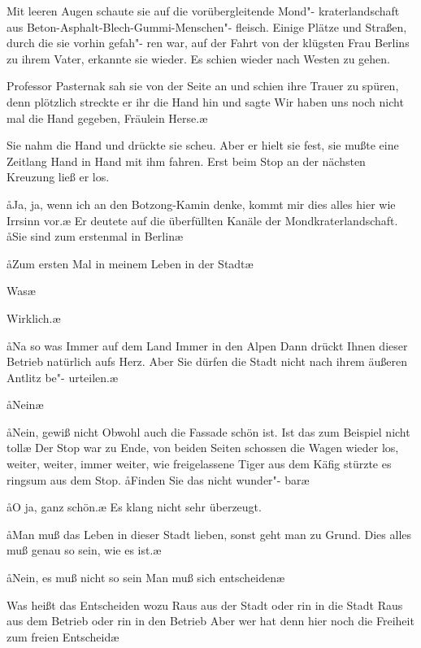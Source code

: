 Mit leeren Augen schaute sie auf die vorübergleitende Mond"-%
kraterlandschaft aus Beton-Asphalt-Blech-Gummi-Menschen"-%
fleisch. Einige Plätze und Straßen, durch die sie vorhin gefah"-%
ren war, auf der Fahrt von der klügsten Frau Berlins zu
ihrem Vater, erkannte sie wieder. Es schien wieder nach
Westen zu gehen.

Professor Pasternak sah sie von der Seite an und schien ihre
Trauer zu spüren, denn plötzlich streckte er ihr die Hand hin
und sagte\dopp{} \aanah{}Wir haben uns noch nicht mal die Hand gegeben,
Fräulein Herse.\ae{}

Sie nahm die Hand und drückte sie scheu. Aber er hielt sie fest,
sie mußte eine Zeitlang Hand in Hand mit ihm fahren.
Erst beim Stop an der nächsten Kreuzung ließ er los.

\aa{}Ja, ja, wenn ich an den Botzong-Kamin denke, kommt mir
dies alles hier wie Irrsinn vor.\ae{} Er deutete auf die überfüllten
Kanäle der Mondkraterlandschaft. \aa{}Sie sind zum erstenmal
in Berlin\frag{}\ae{}

\aa{}Zum ersten Mal in meinem Leben in der Stadt\ausr{}\ae{}

\aanah{}Was\frag{}\ae{}

\aanah{}Wirklich.\ae{}

\aa{}Na so was\ausr{} Immer auf dem Land\frag{} Immer in den Alpen\frag{}
Dann drückt Ihnen dieser Betrieb natürlich aufs Herz. Aber
Sie\eingriff{eS75-1}{Sie ] sie} dürfen die Stadt nicht nach ihrem äußeren Antlitz be"-%
urteilen.\ae{}

\aa{}Nein\frag{}\ae{}

\aa{}Nein, gewiß nicht\ausr{} Obwohl auch die Fassade schön ist. Ist
das zum Beispiel nicht toll\frag{}\ae{} Der Stop war zu Ende, von
beiden Seiten schossen die Wagen wieder los, weiter, weiter,
immer weiter, wie freigelassene Tiger aus dem Käfig stürzte
es ringsum aus dem Stop. \aa{}Finden Sie das nicht wunder"-%
bar\frag{}\ae{}

\aa{}O ja, ganz schön.\ae{} Es klang nicht sehr überzeugt.

\aa{}Man muß das Leben in dieser Stadt lieben, sonst geht man
zu Grund. Dies alles muß genau so sein, wie es ist.\ae{}

\aa{}Nein, es muß nicht so sein\ausr{} Man muß sich entscheiden\ausr{}\ae{}

\aanah{}Was heißt das\frag{} Entscheiden wozu\frag{} Raus aus der Stadt
oder rin in die Stadt\frag{} Raus aus dem Betrieb oder rin in
den Betrieb\frag{} Aber wer hat denn hier noch die Freiheit zum
freien Entscheid\frag{}\ae{}

